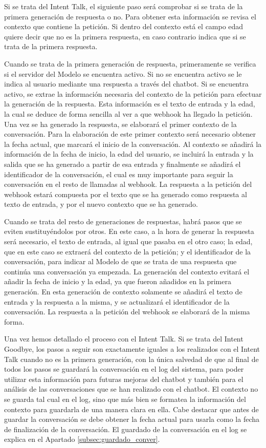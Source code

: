 Si se trata del Intent Talk, el siguiente paso será comprobar si se trata de la primera generación de respuesta o no. Para obtener esta información se revisa el contexto que contiene la petición. Si dentro del contexto está el campo edad quiere decir que no es la primera respuesta, en caso contrario indica que si se trata de la primera respuesta.

Cuando se trata de la primera generación de respuesta, primeramente se verifica si el servidor del Modelo se encuentra activo. Si no se encuentra activo se le indica al usuario mediante una respuesta a través del chatbot. Si se encuentra activo, se extrae la información necesaria del contexto de la petición para efectuar la generación de la respuesta. Esta información es el texto de entrada y la edad, la cual se deduce de forma sencilla al ver a que webhook ha llegado la petición. Una vez se ha generado la respuesta, se elaborará el primer contexto de la conversación. Para la elaboración de este primer contexto será necesario obtener la fecha actual, que marcará el inicio de la conversación. Al contexto se añadirá la información de la fecha de inicio, la edad del usuario, se incluirá la entrada y la salida que se ha generado a partir de esa entrada y finalmente se añadirá el identificador de la conversación, el cual es muy importante para seguir la conversación en el resto de llamadas al webhook. La respuesta a la petición del webhook estará compuesta por el texto que se ha generado como respuesta al texto de entrada, y por el nuevo contexto que se ha generado.

Cuando se trata del resto de generaciones de respuestas, habrá pasos que se eviten sustituyéndolos por otros. En este caso, a la hora de generar la respuesta será necesario, el texto de entrada, al igual que pasaba en el otro caso; la edad, que en este caso se extraerá del contexto de la petición; y el identificador de la conversación, para indicar al Modelo de que se trata de una respuesta que continúa una conversación ya empezada. La generación del contexto evitará el añadir la fecha de inicio y la edad, ya que fueron añadidos en la primera generación. En esta generación de contexto solamente se añadirá el texto de entrada y la respuesta a la misma, y se actualizará el identificador de la conversación. La respuesta a la petición del webhook se elaborará de la misma forma.

Una vez hemos detallado el proceso con el Intent Talk. Si se trata del Intent Goodbye, los pasos a seguir son exactamente iguales a los realizados con el Intent Talk cuando no es la primera generación, con la única salvedad de que al final de todos los pasos se guardará la conversación en el log del sistema, para poder utilizar esta información para futuras mejoras del chatbot y también para el análisis de las conversaciones que se han realizado con el chatbot. El contexto no se guarda tal cual en el log, sino que más bien se formatea la información del contexto para guardarla de una manera clara en ella. Cabe destacar que antes de guardar la conversación se debe obtener la fecha actual para usarla como la fecha de finalización de la conversación. El guardado de la conversación en el log se explica en el Apartado \ref{subsec:guardado_conver}.

